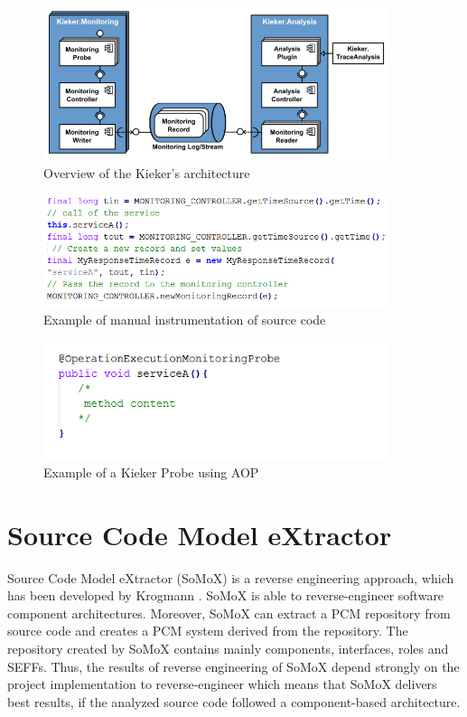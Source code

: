 \begin{figure}[h]
\centering
\includegraphics[width=0.9\textwidth]{figures/kieker}
\caption{Overview of the Kieker's architecture}
\label{fig:kieker}
\end{figure}

\begin{figure}[h]
\centering
\includegraphics[width=0.9\textwidth]{figures/kieker-probe-mixed-img}
\caption{Example of manual instrumentation of source code}
\label{fig:kieker manual instr}
\end{figure}

\begin{figure}[h]
\centering
\includegraphics[width=0.9\textwidth]{figures/kieker-aop-img}
\caption{Example of a Kieker Probe using AOP}
\label{fig:kieker AOP instr}
\end{figure}


\section{Source Code Model eXtractor}
\label{sec:Source Code Model eXtractor}
Source Code Model eXtractor (SoMoX) is a reverse engineering approach, which has been developed by Krogmann \cite{krogmann2012reconstruction}. SoMoX is able to reverse-engineer software component architectures. Moreover, SoMoX can extract a PCM repository from source code and creates a PCM system derived from the repository. The repository created by SoMoX contains mainly components, interfaces, roles and SEFFs. Thus, the results of reverse engineering of SoMoX depend strongly on the project implementation to reverse-engineer which means that SoMoX delivers best results, if the analyzed source code followed a component-based architecture.\\

